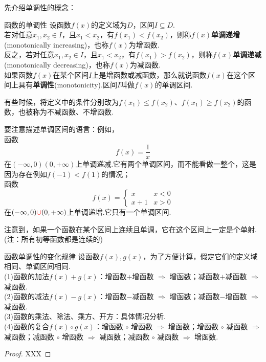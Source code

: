 \documentclass[lang=cn, zihao=5]{elegantbook}
\begin{document}
先介绍单调性的概念：

\begin{definition}{函数的单调性} %
    设函数$f(x)$的定义域为$D$，区间$I \subseteq D$.\\
    若对任意$x_1,x_2 \in I$，且$x_1 < x_2$，有$f(x_1) < f(x_2)$，则称$f(x)$\textbf{单调递增}(monotonically increasing)，也称$f(x)$为增函数.\\
    反之，若对任意$x_1,x_2 \in I$，且$x_1 < x_2$，有$f(x_1) > f(x_2)$，则称$f(x)$\textbf{单调递减}(monotonically decreasing)，也称$f(x)$为减函数.\\
    如果函数$f(x)$在某个区间$I$上是增函数或减函数，那么就说函数$f(x)$在这个区间上具有\textbf{单调性}(monotonicity).区间$I$叫做$f(x)$的单调区间.
\end{definition}
\begin{remark}
    有些时候，将定义中的条件分别改为$f(x_1) \leq f(x_2)$、$f(x_1) \geq f(x_2)$的函数，也被称为不减函数、不增函数.
\end{remark}
\begin{note}
    要注意描述单调区间的语言：例如，\\
    函数$$f(x)=\frac{1}{x}$$
    在$(- \infty , 0)$\color{red}{和}\color{black}$(0 , + \infty)$上单调递减.它有两个单调区间，而不能看做一整个，这是因为存在例如$f(-1) < f(1)$的情况；\\
    函数$$ f(x)=\begin{cases}
    	x &x<0 \\
    	x+1 &x>0
    \end{cases}$$
    在$(- \infty , 0) \color{red}{\cup}\color{black} (0 , + \infty)$上单调递增.它只有一个单调区间.
\end{note}

注意到，如果一个函数在某个区间上连续且单调，它在这个区间上一定是个单射.(注：所有初等函数都是连续的)

\begin{proposition}{函数单调性的变化规律}
    设函数$f(x),g(x)$，为了方便计算，假定它们的定义域相同、单调区间相同.\\
    (1)函数的加法$f(x)+g(x)$：增函数$+$增函数 $\Rightarrow$ 增函数；减函数$+$减函数 $\Rightarrow$ 减函数.\\
    (2)函数的减法$f(x)-g(x)$：增函数$-$减函数 $\Rightarrow$ 增函数；减函数$-$增函数 $\Rightarrow$ 减函数.\\
    (3)函数的乘法、除法、乘方、开方：具体情况分析.\\
    (4)函数的复合$f(x) \circ g(x)$：增函数 $\circ$ 增函数 $\Rightarrow$ 增函数；增函数 $\circ$ 减函数 $\Rightarrow$ 减函数；减函数 $\circ$ 增函数 $\Rightarrow$ 减函数；减函数 $\circ$ 减函数 $\Rightarrow$ 增函数.
\end{proposition}
\begin{proof}
    XXX
\end{proof}
\end{document}
